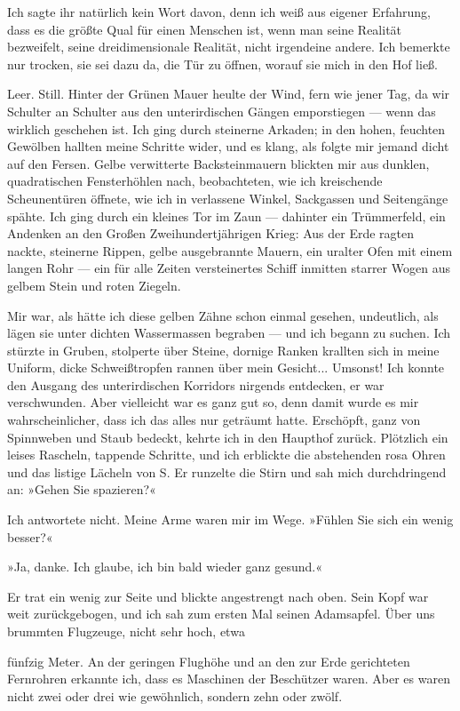 Ich sagte ihr natürlich kein Wort davon, denn ich weiß aus eigener
Erfahrung, dass es die größte Qual für einen Menschen ist, wenn man
seine Realität bezweifelt, seine dreidimensionale Realität, nicht
irgendeine andere. Ich bemerkte nur trocken, sie sei dazu da, die
Tür zu öffnen, worauf sie mich in den Hof ließ.

Leer. Still. Hinter der Grünen Mauer heulte der Wind, fern wie
jener Tag, da wir Schulter an Schulter aus den unterirdischen
Gängen emporstiegen — wenn das wirklich geschehen ist. Ich ging
durch steinerne Arkaden; in den hohen, feuchten Gewölben hallten
meine Schritte wider, und es klang, als folgte mir jemand dicht auf
den Fersen. Gelbe verwitterte Backsteinmauern blickten mir aus
dunklen, quadratischen Fensterhöhlen nach, beobachteten, wie ich
kreischende Scheunentüren öffnete, wie ich in verlassene Winkel,
Sackgassen und Seitengänge spähte. Ich ging durch ein kleines Tor
im Zaun — dahinter ein Trümmerfeld, ein Andenken an den Großen
Zweihundertjährigen Krieg: Aus der Erde ragten nackte, steinerne
Rippen, gelbe ausgebrannte Mauern, ein uralter Ofen mit einem
langen Rohr — ein für alle Zeiten versteinertes Schiff inmitten
starrer Wogen aus gelbem Stein und roten Ziegeln.

Mir war, als hätte ich diese gelben Zähne schon einmal gesehen,
undeutlich, als lägen sie unter dichten Wassermassen begraben — und
ich begann zu suchen. Ich stürzte in Gruben, stolperte über Steine,
dornige Ranken krallten sich in meine Uniform, dicke Schweißtropfen
rannen über mein Gesicht... Umsonst! Ich konnte den Ausgang des
unterirdischen Korridors nirgends entdecken, er war verschwunden.
Aber vielleicht war es ganz gut so, denn damit wurde es mir
wahrscheinlicher, dass ich das alles nur geträumt hatte. Erschöpft,
ganz von Spinnweben und Staub bedeckt, kehrte ich in den Haupthof
zurück. Plötzlich ein leises Rascheln, tappende Schritte, und ich
erblickte die abstehenden rosa Ohren und das listige Lächeln von S.
Er runzelte die Stirn und sah mich durchdringend an: »Gehen Sie
spazieren?«

Ich antwortete nicht. Meine Arme waren mir im Wege. »Fühlen Sie
sich ein wenig besser?«

»Ja, danke. Ich glaube, ich bin bald wieder ganz gesund.«

Er trat ein wenig zur Seite und blickte angestrengt nach oben. Sein
Kopf war weit zurückgebogen, und ich sah zum ersten Mal seinen
Adamsapfel. Über uns brummten Flugzeuge, nicht sehr hoch, etwa

fünfzig Meter. An der geringen Flughöhe und an den zur Erde
gerichteten Fernrohren erkannte ich, dass es Maschinen der
Beschützer waren. Aber es waren nicht zwei oder drei wie
gewöhnlich, sondern zehn oder zwölf.

